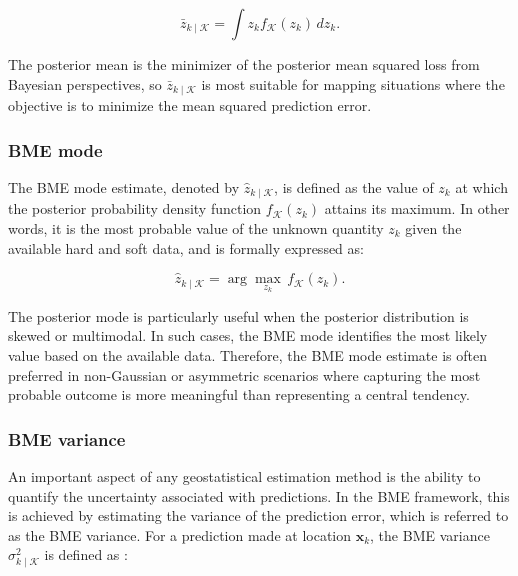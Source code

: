 \vspace{-1em}

\begin{equation}
\bar{z}_{k \mid \mathcal{K}} = \int z_k f_{\mathcal{K}}(z_k) \, d z_k
\label{eq:post-mean}.
\end{equation}

The posterior mean is the minimizer of the posterior mean squared loss from Bayesian perspectives, so \(\bar{z}_{k \mid \mathcal{K}}\) is most suitable for mapping situations where the objective is to minimize the mean squared prediction error.

\subsubsection{BME mode}\label{bme-mode}

The BME mode estimate, denoted by \(\hat{z}_{k \mid \mathcal{K}}\), is defined as the value of \(z_{k}\) at which the posterior probability density function \(f_{\mathcal{K}}(z_k)\) attains its maximum. In other words, it is the most probable value of the unknown quantity \(z_k\) given the available hard and soft data, and is formally expressed as:

\vspace{-1em}

\begin{equation}
\hat{z}_{k \mid \mathcal{K}} = \arg\max_{z_k} \, f_{\mathcal{K}}(z_k)
\label{eq:post-mode}.
\end{equation}

The posterior mode is particularly useful when the posterior distribution is skewed or multimodal. In such cases, the BME mode identifies the most likely value based on the available data. Therefore, the BME mode estimate is often preferred in non-Gaussian or asymmetric scenarios where capturing the most probable outcome is more meaningful than representing a central tendency.

\subsubsection{BME variance}\label{bme-variance}

An important aspect of any geostatistical estimation method is the ability to quantify the uncertainty associated with predictions. In the BME framework, this is achieved by estimating the variance of the prediction error, which is referred to as the BME variance.
For a prediction made at location \(\boldsymbol{x}_k\), the BME variance \(\sigma^2_{k \mid \mathcal{K}}\) is defined as \citep{olea2006six, bogaert1997spatiotemporal}:


